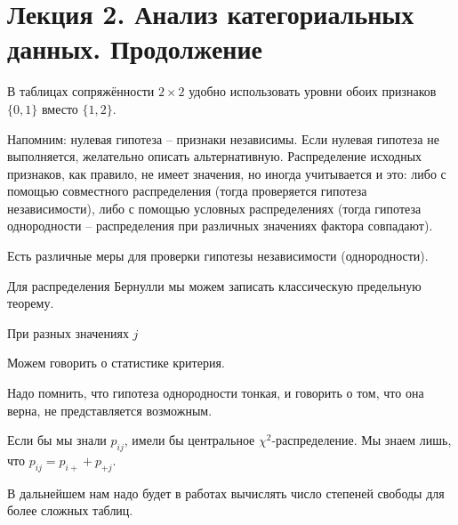\documentclass[main.tex]{subfiles}
\begin{document}
\section{Лекция 2. Анализ категориальных данных. Продолжение}


В  таблицах сопряжённости $ 2 \times 2 $ удобно использовать уровни обоих признаков $ \{ 0, 1\} $ вместо $ \{ 1, 2 \} $.

Напомним: нулевая гипотеза -- признаки независимы.
Если нулевая гипотеза не выполняется, желательно описать альтернативную.
Распределение исходных признаков, как правило, не имеет значения, но иногда учитывается и это: либо с помощью совместного распределения (тогда проверяется гипотеза независимости), либо с помощью условных распределениях (тогда гипотеза однородности -- распределения при различных значениях фактора совпадают).

Есть различные меры для проверки гипотезы независимости (однородности).

Для распределения Бернулли мы можем записать классическую предельную теорему.

При разных значениях $ j $


Можем говорить о статистике критерия.

Надо помнить, что гипотеза однородности тонкая, и говорить о том, что она верна, не представляется возможным.


Если бы мы знали $ p_{ij} $, имели бы центральное $ \chi^2 $-распределение.
Мы знаем лишь, что $ p_{ij} = p_{i+}+p_{+j} $.

\begin{leftbar}
	В дальнейшем нам надо будет в работах вычислять число степеней свободы для более сложных таблиц.
\end{leftbar}
\end{document}
